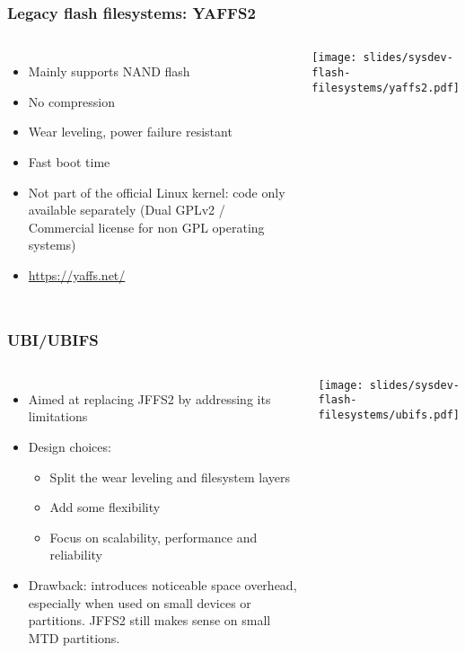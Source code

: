 \begin{frame}
  \frametitle{Legacy flash filesystems: YAFFS2}
  \begin{columns}
    \begin{itemize}
    \item Mainly supports NAND flash
    \item No compression
    \item Wear leveling, power failure resistant
    \item Fast boot time
    \item Not part of the official Linux kernel: code only available
      separately (Dual GPLv2 / Commercial license for non GPL
      operating systems)
    \item \url{https://yaffs.net/}
    \end{itemize}
    \texttt{[image: slides/sysdev-flash-filesystems/yaffs2.pdf]}
  \end{columns}
\end{frame}


\begin{frame}
  \frametitle{UBI/UBIFS}
  \begin{columns}
    \begin{itemize}
    \item Aimed at replacing JFFS2 by addressing its limitations
    \item Design choices:
      \begin{itemize}
      \item Split the wear leveling and filesystem layers
      \item Add some flexibility
      \item Focus on scalability, performance and reliability
      \end{itemize}
    \item Drawback: introduces noticeable space overhead,
      especially when used on small devices or partitions. JFFS2
      still makes sense on small MTD partitions.
    \end{itemize}
    \texttt{[image: slides/sysdev-flash-filesystems/ubifs.pdf]}
  \end{columns}
\end{frame}

